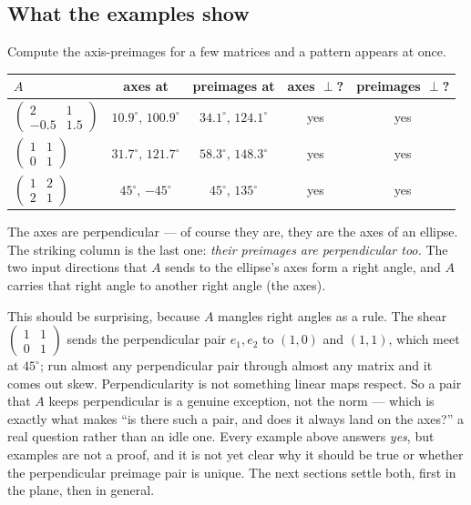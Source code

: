 \documentclass[11pt]{article}
\numberwithin{equation}{section}
\theoremstyle{plainish}
\begin{document}
\subsection{What the examples show}
\label{sec:evidence}

Compute the axis-preimages for a few matrices and a pattern appears at once.

\begin{center}
\renewcommand{\arraystretch}{1.3}
\begin{tabular}{@{}lcccc@{}}
\toprule
$A$ & axes at & preimages at & axes $\perp$? & preimages $\perp$? \\
\midrule
$\left(\begin{smallmatrix}2&1\\-0.5&1.5\end{smallmatrix}\right)$
  & $10.9^\circ,\,100.9^\circ$ & $34.1^\circ,\,124.1^\circ$ & yes & yes \\
$\left(\begin{smallmatrix}1&1\\0&1\end{smallmatrix}\right)$
  & $31.7^\circ,\,121.7^\circ$ & $58.3^\circ,\,148.3^\circ$ & yes & yes \\
$\left(\begin{smallmatrix}1&2\\2&1\end{smallmatrix}\right)$
  & $45^\circ,\,{-45}^\circ$ & $45^\circ,\,135^\circ$ & yes & yes \\
\bottomrule
\end{tabular}
\end{center}

\noindent
The axes are perpendicular --- of course they are, they are the axes of an
ellipse. The striking column is the last one: \emph{their preimages are
perpendicular too.} The two input directions that $A$ sends to the ellipse's axes
form a right angle, and $A$ carries that right angle to another right angle (the
axes).

This should be surprising, because $A$ mangles right angles as a rule. The shear
$\left(\begin{smallmatrix}1&1\\0&1\end{smallmatrix}\right)$ sends the
perpendicular pair $e_1, e_2$ to $(1,0)$ and $(1,1)$, which meet at $45^\circ$;
run almost any perpendicular pair through almost any matrix and it comes out
skew. Perpendicularity is not something linear maps respect. So a pair that $A$
keeps perpendicular is a genuine exception, not the norm --- which is exactly
what makes ``is there such a pair, and does it always land on the axes?'' a real
question rather than an idle one. Every example above answers \emph{yes}, but
examples are not a proof, and it is not yet clear why it should be true or
whether the perpendicular preimage pair is unique. The next sections settle both,
first in the plane, then in general.
\end{document}
